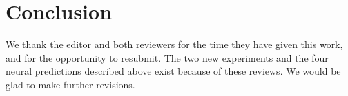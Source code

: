 
\section*{Conclusion}
We thank the editor and both reviewers for the time they have given this work, and for the opportunity to resubmit. The two new experiments and the four neural predictions described above exist because of these reviews. We would be glad to make further revisions.

\renewcommand{\refname}{References}
{\footnotesize

}



